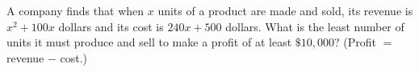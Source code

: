 A company finds that when $x$ units of a product are made and sold, its revenue is $x^2+100x$ dollars and its cost is $240x+500$ dollars. What is the least number of units it must produce and sell to make a profit of at least $\$10{,}000$? (Profit $=$ revenue $-$ cost.)
